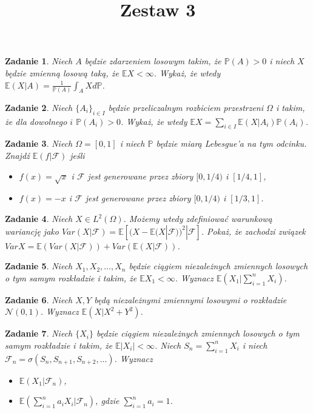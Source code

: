 \documentclass{mwart}
\title{Zestaw 3}
\newtheorem{zd}{Zadanie}
\begin{document}

\maketitle

\begin{zd}
Niech $A$ będzie zdarzeniem losowym takim, że $\mathbb{P}(A) > 0$ i niech $X$ będzie zmienną losową taką, że $\mathbb{E}X < \infty$. Wykaż, że wtedy $\mathbb{E}(X|A) = \frac{1}{\mathbb{P}(A)}\int_AXd\mathbb{P}$.
\end{zd}

\begin{zd}
Niech $\{A_i\}_{i \in I}$ będzie przeliczalnym rozbiciem przestrzeni $\Omega$ i takim, że dla dowolnego $i$ $\mathbb{P}(A_i) > 0$. Wykaż, że wtedy $\mathbb{E}X = \sum_{i\in I}\mathbb{E}(X|A_i)\mathbb{P}(A_i)$.
\end{zd}

\begin{zd}
Niech $\Omega = [0, 1]$ i niech $\mathbb{P}$ będzie miarą Lebesgue'a na tym odcinku. Znajdź $\mathbb{E}(f|\mathcal{F})$ jeśli
\begin{itemize}
\item $f(x) = \sqrt{x}$ i $\mathcal{F}$ jest generowane przez zbiory $[0, 1/4)$ i $[1/4, 1]$,
\item $f(x) = -x$ i $\mathcal{F}$ jest generowane przez zbiory $[0, 1/4)$ i $[1/3, 1]$.
\end{itemize}
\end{zd}

\begin{zd}
Niech $X\in L^2(\Omega)$. Możemy wtedy zdefiniować warunkową wariancję jako $Var(X|\mathcal{F}) = \mathbb{E}\left[(X - \mathbb{E}(X|\mathcal{F}))^2|\mathcal{F}\right]$. Pokaż, że zachodzi związek $VarX = \mathbb{E}\left(Var(X|\mathcal{F})\right) + Var\left(\mathbb{E}(X|\mathcal{F})\right)$.
\end{zd}

\begin{zd}
Niech $X_1, X_2, \dots, X_n$ będzie ciągiem niezależnych zmiennych losowych o tym samym rozkładzie i takim, że $\mathbb{E}X_1 < \infty$. Wyznacz $\mathbb{E}(X_1|\sum_{i=1}^nX_i)$.
\end{zd}

\begin{zd}
Niech $X, Y$ będą niezależnymi zmiennymi losowymi o rozkładzie $\mathcal{N}(0, 1)$. Wyznacz $\mathbb{E}(X|X^2+Y^2)$.
\end{zd}

\begin{zd}
Niech $\{X_i\}$ będzie ciągiem niezależnych zmiennych losowych o tym samym rozkładzie i takim, że $\mathbb{E}|X_i|<\infty$. Niech $S_n = \sum_{i=1}^nX_i$ i niech $\mathcal{F}_n = \sigma\left(S_n, S_{n+1}, S_{n+2}, \dots\right)$. Wyznacz
\begin{itemize}
\item $\mathbb{E}(X_1|\mathcal{F}_n)$,
\item $\mathbb{E}\left(\sum_{i=1}^na_iX_i|\mathcal{F}_n\right)$, gdzie $\sum_{i=1}^na_i = 1$.
\end{itemize}
\end{zd}
\end{document}
